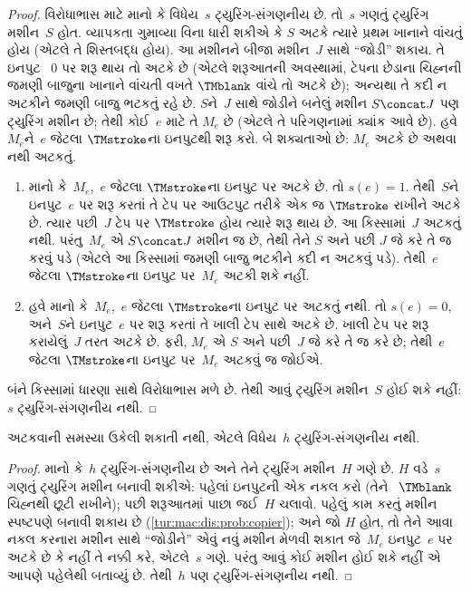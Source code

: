 \documentclass[../../../include/open-logic-section]{subfiles}
\begin{document}
\begin{proof}
વિરોધાભાસ માટે માનો કે વિધેય~$s$ ટ્યુરિંગ-સંગણનીય
છે. તો~$s$ ગણતું ટ્યુરિંગ મશીન~$S$ હોત. વ્યાપકતા
ગુમાવ્યા વિના ધારી શકીએ કે $S$ અટકે ત્યારે પ્રથમ
ખાનાને વાંચતું હોય (એટલે તે શિસ્તબદ્ધ હોય). આ
મશીનને બીજા મશીન~$J$ સાથે ``જોડી'' શકાય. તે ઇનપુટ
~$0$ પર શરૂ થાય તો અટકે છે (એટલે શરૂઆતની અવસ્થામાં,
ટેપના છેડાના ચિહ્નની જમણી બાજુના ખાનાને વાંચતી વખતે
$\TMblank$ વાંચે તો અટકે છે); અન્યથા તે કદી ન અટકીને
જમણી બાજુ ભટકતું રહે છે. $S$ને~$J$ સાથે જોડીને
બનેલું મશીન $S \concat J$ પણ ટ્યુરિંગ મશીન છે;
તેથી કોઈ~$e$ માટે તે $M_e$ છે (એટલે તે પરિગણનામાં
ક્યાંક આવે છે). હવે~$M_e$ને~$e$ જેટલા $\TMstroke$ના
ઇનપુટથી શરૂ કરો. બે શક્યતાઓ છે: $M_e$ અટકે છે
અથવા નથી અટકતું.
\begin{enumerate}
\item માનો કે~$M_e$,~$e$ જેટલા $\TMstroke$ના ઇનપુટ
  પર અટકે છે. તો $s(e) = 1$. તેથી~$S$ને ઇનપુટ~$e$
  પર શરૂ કરતાં તે ટેપ પર આઉટપુટ તરીકે એક જ
  $\TMstroke$ રાખીને અટકે છે. ત્યાર પછી~$J$ ટેપ પર
  $\TMstroke$ હોય ત્યારે શરૂ થાય છે. આ કિસ્સામાં~$J$
  અટકતું નથી. પરંતુ~$M_e$ એ $S \concat J$ મશીન જ
  છે, તેથી તેને $S$ અને પછી $J$ જે કરે તે જ કરવું
  પડે (એટલે આ કિસ્સામાં જમણી બાજુ ભટકીને કદી ન
  અટકવું પડે). તેથી~$e$ જેટલા $\TMstroke$ના ઇનપુટ
  પર~$M_e$ અટકી શકે નહીં.

\item હવે માનો કે~$M_e$,~$e$ જેટલા $\TMstroke$ના
  ઇનપુટ પર અટકતું નથી. તો $s(e) = 0$, અને~$S$ને
  ઇનપુટ~$e$ પર શરૂ કરતાં તે ખાલી ટેપ સાથે અટકે છે.
  ખાલી ટેપ પર શરૂ કરાયેલું~$J$ તરત અટકે છે. ફરી,
  $M_e$ એ $S$ અને પછી~$J$ જે કરે તે જ કરે છે;
  તેથી~$e$ જેટલા $\TMstroke$ના ઇનપુટ પર~$M_e$
  અટકવું જ જોઈએ.
\end{enumerate}
બંને કિસ્સામાં ધારણા સાથે વિરોધાભાસ મળે છે. તેથી
આવું ટ્યુરિંગ મશીન~$S$ હોઈ શકે નહીં: $s$ ટ્યુરિંગ-સંગણનીય
નથી.
\end{proof}

\begin{thm}
 અટકવાની સમસ્યા ઉકેલી
શકાતી નથી, એટલે વિધેય~$h$ ટ્યુરિંગ-સંગણનીય નથી.
\end{thm}

\begin{proof}
માનો કે~$h$ ટ્યુરિંગ-સંગણનીય છે અને તેને ટ્યુરિંગ
મશીન~$H$ ગણે છે. $H$ વડે~$s$ ગણતું ટ્યુરિંગ મશીન
બનાવી શકીએ: પહેલાં ઇનપુટની એક નકલ કરો (તેને
~$\TMblank$ ચિહ્નથી છૂટી રાખીને); પછી શરૂઆતમાં
પાછા જઈ~$H$ ચલાવો. પહેલું કામ કરતું મશીન સ્પષ્ટપણે
બનાવી શકાય છે (\cref{tur:mac:dis:prob:copier});
અને જો $H$ હોત, તો તેને આવા નકલ કરનારા મશીન સાથે
``જોડીને'' એવું નવું મશીન મેળવી શકાત જે~$M_e$
ઇનપુટ~$e$ પર અટકે છે કે નહીં તે નક્કી કરે, એટલે~$s$
ગણે. પરંતુ આવું કોઈ મશીન હોઈ શકે નહીં એ આપણે પહેલેથી
બતાવ્યું છે. તેથી~$h$ પણ ટ્યુરિંગ-સંગણનીય નથી.
\end{proof}
\end{document}

